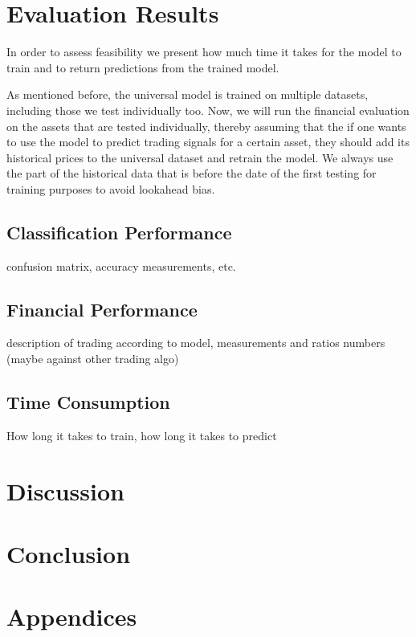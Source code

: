 \documentclass[11pt, a4paper]{article}
\begin{document}
\section{Evaluation Results}
\label{sec:ER}

In order to assess feasibility we present how much time it takes for the model to train and to return predictions from the trained model. 

As mentioned before, the universal model is trained on multiple datasets, including those we test individually too. Now, we will run the financial evaluation on the assets that are tested individually, thereby assuming that the if one wants to use the model to predict trading signals for a certain asset, they should add its historical prices to the universal dataset and retrain the model.
We always use the part of the historical data that is before the date of the first testing for training purposes to avoid lookahead bias.

\subsection{Classification Performance}
\label{subsec:ER:ClassPerf}
confusion matrix, accuracy measurements, etc.

\subsection{Financial Performance}
\label{subsec:ER:FinPerf}
description of trading according to model, measurements and ratios
numbers (maybe against other trading algo)

\subsection{Time Consumption}
\label{subsec:ER:TimePerf}
How long it takes to train, how long it takes to predict

\section{Discussion}
\label{sec:Discuss}

\section{Conclusion}
\label{sec:Conclusion}

\section{Appendices}
\label{sec:App}
\end{document}
